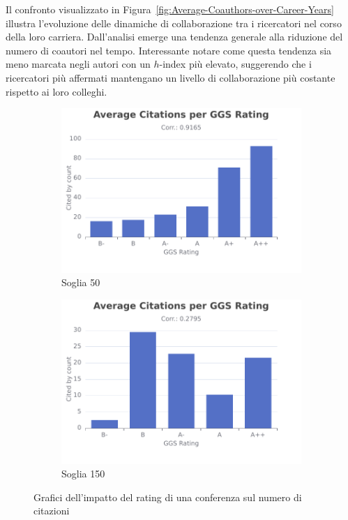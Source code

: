 Il confronto visualizzato in Figura~\ref{fig:Average-Coauthors-over-Career-Years} illustra l'evoluzione delle dinamiche di collaborazione tra i ricercatori nel corso della loro carriera. Dall'analisi emerge una tendenza generale alla riduzione del numero di coautori nel tempo. Interessante notare come questa tendenza sia meno marcata negli autori con un $h$-index più elevato, suggerendo che i ricercatori più affermati mantengano un livello di collaborazione più costante rispetto ai loro colleghi.

\begin{figure}[ht]
    \centering
    \begin{subfigure}{0.49\textwidth}
        \includegraphics[width=\textwidth]{images/Average-Citations-per-GGS-Rating-50.pdf}
        \caption{Soglia 50}
        \label{fig:Average-Citations-per-GGS-Rating-50}
    \end{subfigure}
    \hfill
    \begin{subfigure}{0.49\textwidth}
        \includegraphics[width=\textwidth]{images/Average-Citations-per-GGS-Rating-150.pdf}
        \caption{Soglia 150}
        \label{fig:Average-Citations-per-GGS-Rating-150}
    \end{subfigure}        
    \caption{Grafici dell'impatto del rating di una conferenza sul numero di citazioni}
    \label{fig:Average-Citations-per-GGS-Rating}
\end{figure}

